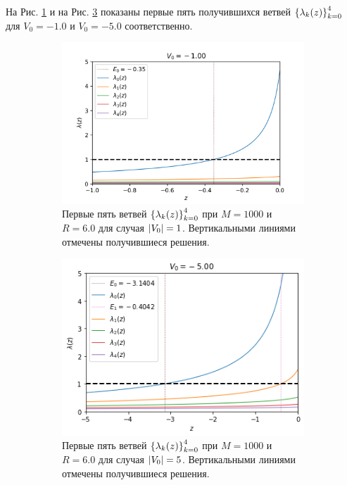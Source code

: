 \documentclass[10pt]{article}
\begin{document}
На Рис. \ref{fig:-1.0_l5} и на Рис. \ref{fig:-5.0_l5} показаны первые пять получившихся ветвей $\qty{\lambda_k(z)}_{k=0}^4$ для $V_0 = -1.0$ и $V_0=-5.0$ соответственно.
\begin{figure}[htbp]
 \centering
 \begin{subfigure}[b]{0.49\textwidth}
    \includegraphics[width=\textwidth]{../figures/-1.0_l5}
    \caption{Первые пять ветвей $\qty{\lambda_k(z)}_{k=0}^4$ при $M=1000$ и $R=6.0$ для случая $\abs{V_0}=1$. Вертикальными линиями отмечены получившиеся решения.}
    \label{fig:-1.0_l5}
\end{subfigure}
\hfill
 \begin{subfigure}[b]{0.49\textwidth}
    \includegraphics[width=\textwidth]{../figures/-5.0_l5}
    \caption{Первые пять ветвей $\qty{\lambda_k(z)}_{k=0}^4$ при $M=1000$ и $R=6.0$ для случая $\abs{V_0}=5$. Вертикальными линиями отмечены получившиеся решения.}
    \label{fig:-5.0_l5}
\end{subfigure}
\caption{}
\end{figure}
\end{document}
